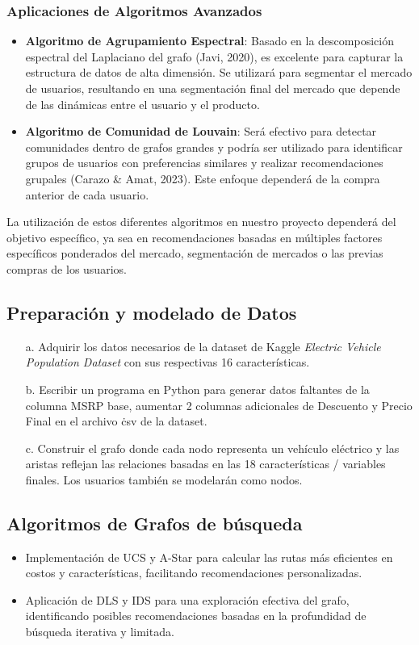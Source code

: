 \documentclass[12pt]{article}
\begin{document}
\subsubsection*{Aplicaciones de Algoritmos Avanzados}
\begin{itemize}
    \item \textbf{Algoritmo de Agrupamiento Espectral}: Basado en la descomposición espectral del Laplaciano del grafo (Javi, 2020), es excelente para capturar la estructura de datos de alta dimensión. Se utilizará para segmentar el mercado de usuarios, resultando en una segmentación final del mercado que depende de las dinámicas entre el usuario y el producto.
    \item \textbf{Algoritmo de Comunidad de Louvain}: Será efectivo para detectar comunidades dentro de grafos grandes y podría ser utilizado para identificar grupos de usuarios con preferencias similares y realizar recomendaciones grupales (Carazo \& Amat, 2023). Este enfoque dependerá de la compra anterior de cada usuario.
\end{itemize}

La utilización de estos diferentes algoritmos en nuestro proyecto dependerá del objetivo específico, ya sea en recomendaciones basadas en múltiples factores específicos ponderados del mercado, segmentación de mercados o las previas compras de los usuarios.



\subsection{Preparación y modelado de Datos}
\begin{enumerate}
    \item[a.] Adquirir los datos necesarios de la dataset de Kaggle \textit{Electric Vehicle Population Dataset} con sus respectivas 16 características. 
    \item[b.] Escribir un programa en Python para generar datos faltantes de la columna MSRP base, aumentar 2 columnas adicionales de Descuento y Precio Final en el archivo \.csv de la dataset.
    \item[c.] Construir el grafo donde cada nodo representa un vehículo eléctrico y las aristas reflejan las relaciones basadas en las 18 características / variables finales. Los usuarios también se modelarán como nodos.
\end{enumerate}


\subsection{Algoritmos de Grafos de búsqueda}
\begin{itemize}
    \item Implementación de UCS y A-Star para calcular las rutas más eficientes en costos y características, facilitando recomendaciones personalizadas.
    \item Aplicación de DLS y IDS para una exploración efectiva del grafo, identificando posibles recomendaciones basadas en la profundidad de búsqueda iterativa y limitada.
\end{itemize}
\end{document}
